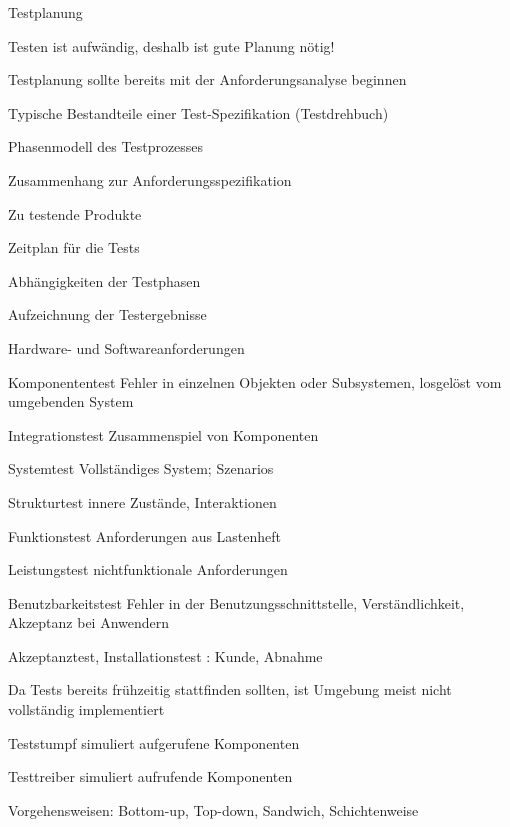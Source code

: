 \documentclass[a4paper]{article}
\begin{document}
\begin{multicols}{3}
  Testplanung
  \begin{itemize*}
    \item Testen ist aufwändig, deshalb ist gute Planung nötig!
    \item Testplanung sollte bereits mit der Anforderungsanalyse beginnen
    \item Typische Bestandteile einer Test-Spezifikation (Testdrehbuch)
    \begin{itemize*}
      \item Phasenmodell des Testprozesses
      \item Zusammenhang zur Anforderungsspezifikation
      \item Zu testende Produkte
      \item Zeitplan für die Tests
      \item Abhängigkeiten der Testphasen
      \item Aufzeichnung der Testergebnisse
      \item Hardware- und Softwareanforderungen
    \end{itemize*}
  \end{itemize*}

  \begin{description*}
    \item[Komponententest] Fehler in einzelnen Objekten oder Subsystemen, losgelöst vom umgebenden System
    \item[Integrationstest] Zusammenspiel von Komponenten
    \item[Systemtest] Vollständiges System; Szenarios
    \item[Strukturtest] innere Zustände, Interaktionen
    \item[Funktionstest] Anforderungen aus Lastenheft
    \item[Leistungstest] nichtfunktionale Anforderungen
    \item[Benutzbarkeitstest] Fehler in der Benutzungsschnittstelle, Verständlichkeit, Akzeptanz bei Anwendern
    \item[Akzeptanztest, Installationstest]: Kunde, Abnahme
  \end{description*}

  \begin{itemize*}
    \item Da Tests bereits frühzeitig stattfinden sollten, ist Umgebung meist nicht vollständig implementiert
    \begin{itemize*}
      \item Teststumpf simuliert aufgerufene Komponenten
      \item Testtreiber simuliert aufrufende Komponenten
    \end{itemize*}
    \item Vorgehensweisen: Bottom-up, Top-down, Sandwich, Schichtenweise
  \end{itemize*}


\end{multicols}
\end{document}

